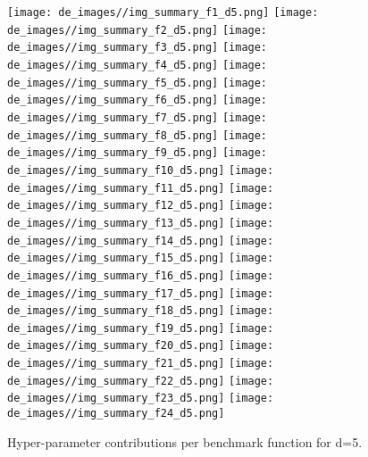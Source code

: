 \begin{figure}[t]
\centering
	\texttt{[image: de\_images//img\_summary\_f1\_d5.png]}
	\texttt{[image: de\_images//img\_summary\_f2\_d5.png]}
	\texttt{[image: de\_images//img\_summary\_f3\_d5.png]}
	\texttt{[image: de\_images//img\_summary\_f4\_d5.png]}
	\texttt{[image: de\_images//img\_summary\_f5\_d5.png]}
	\texttt{[image: de\_images//img\_summary\_f6\_d5.png]}
	\texttt{[image: de\_images//img\_summary\_f7\_d5.png]}
	\texttt{[image: de\_images//img\_summary\_f8\_d5.png]}
	\texttt{[image: de\_images//img\_summary\_f9\_d5.png]}
	\texttt{[image: de\_images//img\_summary\_f10\_d5.png]}
	\texttt{[image: de\_images//img\_summary\_f11\_d5.png]}
	\texttt{[image: de\_images//img\_summary\_f12\_d5.png]}
	\texttt{[image: de\_images//img\_summary\_f13\_d5.png]}
	\texttt{[image: de\_images//img\_summary\_f14\_d5.png]}
	\texttt{[image: de\_images//img\_summary\_f15\_d5.png]}
	\texttt{[image: de\_images//img\_summary\_f16\_d5.png]}
	\texttt{[image: de\_images//img\_summary\_f17\_d5.png]}
	\texttt{[image: de\_images//img\_summary\_f18\_d5.png]}
	\texttt{[image: de\_images//img\_summary\_f19\_d5.png]}
	\texttt{[image: de\_images//img\_summary\_f20\_d5.png]}
	\texttt{[image: de\_images//img\_summary\_f21\_d5.png]}
	\texttt{[image: de\_images//img\_summary\_f22\_d5.png]}
	\texttt{[image: de\_images//img\_summary\_f23\_d5.png]}
	\texttt{[image: de\_images//img\_summary\_f24\_d5.png]}
\caption{Hyper-parameter contributions per benchmark function for d=5. \label{fig:shapxplaind5}}

\end{figure}

